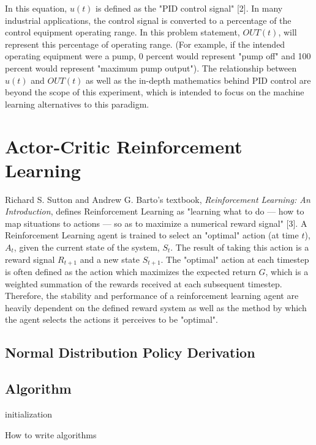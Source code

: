 \documentclass{article}
\begin{document}
In this equation, $u(t)$ is defined as the "PID control signal" [2].  In many industrial applications, the control signal is converted to a percentage of the control equipment operating range.  In this problem statement, $OUT(t)$, will represent this percentage of operating range.  (For example, if the intended operating equipment were a pump, 0 percent would represent "pump off" and 100 percent would represent "maximum pump output").  The relationship between $u(t)$ and $OUT(t)$ as well as the in-depth mathematics behind PID control are beyond the scope of this experiment, which is intended to focus on the machine learning alternatives to this paradigm.

\section{Actor-Critic Reinforcement Learning}

Richard S. Sutton and Andrew G. Barto's textbook, {\em Reinforcement Learning: An Introduction}, defines Reinforcement Learning as "learning what to do — how to map situations to actions — so as to maximize a numerical reward signal" [3].  A Reinforcement Learning agent is trained to select an "optimal" action (at time $t$), $A_t$, given the current state of the system, $S_t$.  The result of taking this action is a reward signal $R_{t+1}$ and a new state $S_{t+1}$.  The "optimal" action at each timestep is often defined as the action which maximizes the expected return $G$, which is a weighted summation of the rewards received at each subsequent timestep.  Therefore, the stability and performance of a reinforcement learning agent are heavily dependent on the defined reward system as well as the method by which the agent selects the actions it perceives to be "optimal".



\subsection{Normal Distribution Policy Derivation}

\subsection{Algorithm}

\begin{algorithm}[H]
\SetAlgoLined
{}
 initialization\;
 \caption{How to write algorithms}
\end{algorithm}
\end{document}
